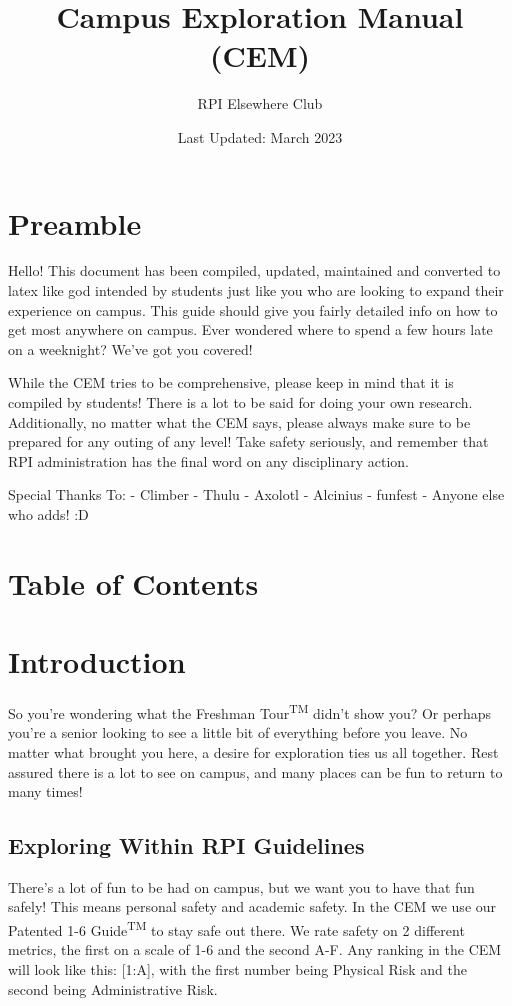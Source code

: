 \documentclass{article}
\title{Campus Exploration Manual (CEM)}
\author{RPI Elsewhere Club}
\date{Last Updated: March 2023}
\begin{document}
  \maketitle
  \section{Preamble}

  Hello! This document has been compiled, updated, maintained and converted to latex like god intended by students just like you who are looking to expand their experience on campus. This guide should give you fairly detailed info on how to get most anywhere on campus. Ever wondered where to spend a few hours late on a weeknight? We’ve got you covered!

While the CEM tries to be comprehensive, please keep in mind that it is compiled by students! There is a lot to be said for doing your own research. Additionally, no matter what the CEM says, please always make sure to be prepared for any outing of any level! Take safety seriously, and remember that RPI administration has the final word on any disciplinary action.

Special Thanks To:
- Climber
- Thulu
- Axolotl
- Alcinius
- funfest
- Anyone else who adds! :D

  \pagebreak
  \section{Table of Contents}
  \tableofcontents
  \pagebreak
  \section{Introduction}
  So you’re wondering what the Freshman Tour\textsuperscript{TM} didn’t show you? Or perhaps you’re a senior looking to see a little bit of everything before you leave. No matter what brought you here, a desire for exploration ties us all together. Rest assured there is a lot to see on campus, and many places can be fun to return to many times!
  \subsection{Exploring Within RPI Guidelines}
  There’s a lot of fun to be had on campus, but we want you to have that fun safely! This means personal safety and academic safety. In the CEM we use our Patented 1-6 Guide\textsuperscript{TM} to stay safe out there. We rate safety on 2 different metrics, the first on a scale of 1-6 and the second A-F. Any ranking in the CEM will look like this: [1:A], with the first number being Physical Risk and the second being Administrative Risk.
\end{document}

